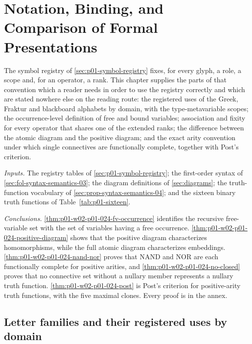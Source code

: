 \chapter{Notation, Binding, and Comparison of Formal Presentations}
\label{sec:p01-w02-p01-024-notation}

The symbol registry of \cref{sec:p01-symbol-registry} fixes, for every glyph,
a role, a scope and, for an operator, a rank.  This chapter supplies the
parts of that convention which a reader needs in order to use the registry
correctly and which are stated nowhere else on the reading route: the
registered uses of the Greek, Fraktur and blackboard alphabets by domain,
with the type-metavariable scopes; the occurrence-level definition of free
and bound variables; association and fixity for every operator that shares
one of the extended ranks; the difference between the atomic diagram and
the positive diagram; and the exact arity convention under which single
connectives are functionally complete, together with Post's criterion.

\emph{Inputs.}  The registry tables of \cref{sec:p01-symbol-registry}; the
first-order syntax of \cref{sec:fol-syntax-semantics-03}; the diagram
definitions of \cref{sec:diagrams}; the truth-function vocabulary of
\cref{sec:prop-syntax-semantics-04}; and the sixteen binary truth functions
of Table~\ref{tab:p01-sixteen}.

\emph{Conclusions.}  \cref{thm:p01-w02-p01-024-fv-occurrence} identifies
the recursive free-variable set with the set of variables having a free
occurrence.  \cref{thm:p01-w02-p01-024-positive-diagram} shows that the
positive diagram characterizes homomorphisms, while the full atomic diagram
characterizes embeddings.  \cref{thm:p01-w02-p01-024-nand-nor} proves that
NAND and NOR are each functionally complete for positive arities, and
\cref{thm:p01-w02-p01-024-no-closed} proves that no connective set without a
nullary member represents a nullary truth function.
\cref{thm:p01-w02-p01-024-post} is Post's criterion for positive-arity
truth functions, with the five maximal clones.  Every proof is in the
annex.

\section{Letter families and their registered uses by domain}
\label{sec:p01-w02-p01-024-letters}

